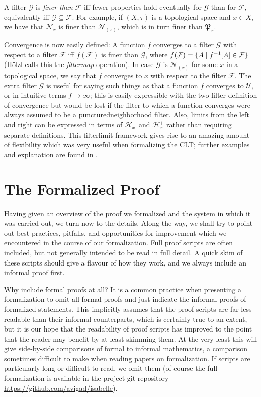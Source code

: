 \documentclass[leqno]{article}
\theoremstyle{definition}
\newcommand{\bldset}[2]{\{{#1}\mid{#2}\}}
\begin{document}
A filter $\mathcal G$ is {\em finer than} $\mathcal F$ iff fewer properties hold eventually for $\mathcal G$ than for $\mathcal F$, equivalently iff $\mathcal G \subseteq \mathcal F$. For example, if $(X, \tau)$ is a topological space and $x \in X$, we have that $\mathcal N_x$ is finer than $\mathcal N_{(x)}$, which is in turn finer than $\mathfrak P_x$.

Convergence is now easily defined: A function $f$ converges to a filter $\mathcal G$ with respect to a filter $\mathcal F$ iff $f(\mathcal F)$ is finer than $\mathcal G$, where $f(\mathcal F) = \bldset{A}{f\inv[A] \in \mathcal F}$ (H\"olzl calls this the {\em filtermap} operation). In case $\mathcal G$ is $\mathcal N_{(x)}$ for some $x$ in a topological space, we say that $f$ converges to $x$ with respect to the filter $\mathcal F$. The extra filter $\mathcal G$ is useful for saying such things as that a function $f$ converges to $\mathcal U$, or in intuitive terms $f \rightarrow \infty$; this is easily expressible with the two-filter definition of convergence but would be lost if the filter to which a function converges were always assumed to be a puncturedneighborhood filter. Also, limits from the left and right can be expressed in terms of $\mathcal H_x^-$ and $\mathcal H_x^+$ rather than requiring separate definitions. This filterlimit framework gives rise to an amazing amount of flexibility which was very useful when formalizing the CLT; further examples and explanation are found in \cite{hoelzl-filter}.

\section{The Formalized Proof} \label{sec:form}

Having given an overview of the proof we formalized and the system in which it was carried out, we turn now to the details. Along the way, we shall try to point out best practices, pitfalls, and opportunities for improvement which we encountered in the course of our formalization. Full proof scripts are often included, but not generally intended to be read in full detail. A quick skim of these scripts should give a flavour of how they work, and we always include an informal proof first.

Why include formal proofs at all? It is a common practice when presenting a formalization to omit all formal proofs and just indicate the informal proofs of formalized statements. This implicitly assumes that the proof scripts are far less readable than their informal counterparts, which is certainly true to an extent, but it is our hope that the readability of proof scripts has improved to the point that the reader may benefit by at least skimming them. At the very least this will give side-by-side comparisons of formal to informal mathematics, a comparison sometimes difficult to make when reading papers on formalization. If scripts are particularly long or difficult to read, we omit them (of course the full formalization is available in the project git repository \linebreak \url{https://github.com/avigad/isabelle}).
\end{document}
